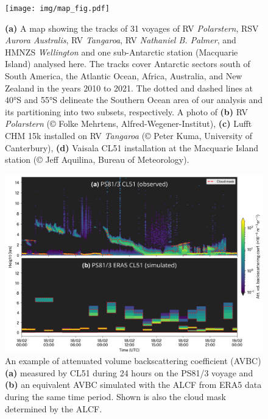 \documentclass[12pt,a4paper]{article}
\begin{document}
\begin{figure}
\centering
\texttt{[image: img/map\_fig.pdf]}
\caption{
\textbf{(a)} A map showing the tracks of 31 voyages of RV \emph{Polarstern},
RSV \emph{Aurora Australis}, RV \emph{Tangaroa}, RV \emph{Nathaniel B. Palmer},
and HMNZS \emph{Wellington} and one sub-Antarctic station (Macquarie Island)
analysed here. The tracks cover Antarctic sectors south of South America, the
Atlantic Ocean, Africa, Australia, and New Zealand in the years 2010 to 2021.
The dotted and dashed lines at 40°S and 55°S delineate the Southern
Ocean area of our analysis and its partitioning into two subsets, respectively.
A photo of \textbf{(b)} RV \emph{Polarstern} (© Folke Mehrtens,
Alfred-Wegener-Institut), \textbf{(c)} Lufft CHM 15k installed on RV
\emph{Tangaroa} (© Peter Kuma, University of Canterbury), \textbf{(d)} Vaisala
CL51 installation at the Macquarie Island station (© Jeﬀ Aquilina, Bureau of
Meteorology).
}
\label{fig:map}
\end{figure}

\begin{figure}
\centering
\includegraphics[width=\textwidth]{img/example.png}
\caption{
An example of attenuated volume backscattering coefficient (AVBC) \textbf{(a)}
measured by CL51 during 24 hours on the PS81/3 voyage and \textbf{(b)} an
equivalent AVBC simulated with the ALCF from ERA5 data during the same time
period. Shown is also the cloud mask determined by the ALCF.
}
\label{fig:example}
\end{figure}
\end{document}
